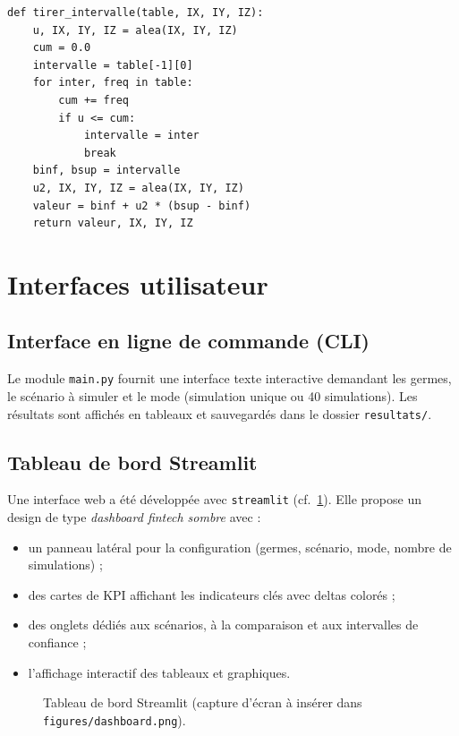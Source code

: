 \documentclass[12pt,a4paper,oneside]{report}
\newcommand{\code}[1]{\texttt{\color{primary}#1}}
\begin{document}
\begin{lstlisting}[caption={Méthode de transformation inverse (distributions.py).}]
def tirer_intervalle(table, IX, IY, IZ):
    u, IX, IY, IZ = alea(IX, IY, IZ)
    cum = 0.0
    intervalle = table[-1][0]
    for inter, freq in table:
        cum += freq
        if u <= cum:
            intervalle = inter
            break
    binf, bsup = intervalle
    u2, IX, IY, IZ = alea(IX, IY, IZ)
    valeur = binf + u2 * (bsup - binf)
    return valeur, IX, IY, IZ
\end{lstlisting}

\section{Interfaces utilisateur}

\subsection{Interface en ligne de commande (CLI)}

Le module \code{main.py} fournit une interface texte interactive
demandant les germes, le scénario à simuler et le mode (simulation unique
ou 40 simulations). Les résultats sont affichés en tableaux et
sauvegardés dans le dossier \code{resultats/}.

\subsection{Tableau de bord Streamlit}

Une interface web a été développée avec \code{streamlit}
(cf.~\cref{fig:dashboard}). Elle propose un design de type
\emph{dashboard fintech sombre} avec :
\begin{itemize}
  \item un panneau latéral pour la configuration (germes, scénario, mode,
        nombre de simulations) ;
  \item des cartes de KPI affichant les indicateurs clés avec deltas
        colorés ;
  \item des onglets dédiés aux scénarios, à la comparaison et aux
        intervalles de confiance ;
  \item l'affichage interactif des tableaux et graphiques.
\end{itemize}

\begin{figure}[H]
  \centering
  \fbox{\rule{0pt}{6cm}\rule{12cm}{0pt}}
  \caption{Tableau de bord Streamlit (capture d'écran à insérer dans
           \texttt{figures/dashboard.png}).}
  \label{fig:dashboard}
\end{figure}
\end{document}
